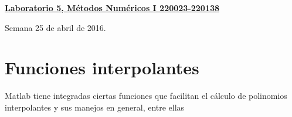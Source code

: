 \documentclass[11pt]{article}
\begin{document}
\hspace*{-1,5cm}


\vspace*{0.5cm} \centerline {\bf\underline{Laboratorio 5, M\'etodos Num\'ericos I 220023-220138}}
\centerline{\textrm{Semana 25 de abril de 2016.}}  \vspace{0.2cm}




\section{Funciones interpolantes}


Matlab tiene integradas ciertas funciones que facilitan el c\'alculo de polinomios interpolantes y sus manejos en general, entre ellas
\end{document}
